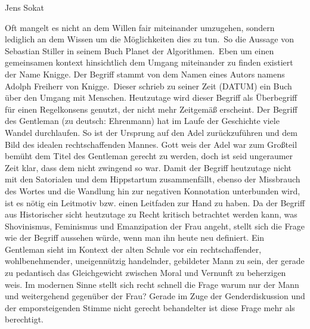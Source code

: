 Jens Sokat

\glqq Oft mangelt es nicht an dem Willen fair miteinander umzugehen, sondern lediglich an dem Wissen um die Möglichkeiten dies zu tun.\grqq \ So die Aussage von Sebastian Stiller
in seinem Buch \glqq Planet der Algorithmen.\grqq \ Eben um einen gemeinsamen kontext hinsichtlich dem Umgang miteinander zu finden existiert der Name Knigge. Der Begriff stammt
von dem Namen eines Autors namens \glqq Adolph Freiherr von Knigge.\grqq \ Dieser schrieb zu seiner Zeit (DATUM) ein Buch über den Umgang mit Menschen. Heutzutage wird dieser
Begriff als Überbegriff für einen Regelkonsens genutzt, der nicht mehr Zeitgemäß erscheint.
Der Begriff des Gentleman (zu deutsch: Ehrenmann) hat im Laufe der Geschichte viele Wandel durchlaufen. 
So ist der Ursprung auf den Adel zurückzuführen und dem Bild des idealen rechtschaffenden Mannes. 
Gott weis der Adel war zum Großteil bemüht dem Titel des Gentleman gerecht zu werden, doch ist seid ungeraumer Zeit klar, 
dass dem nicht zwingend so war. Damit der Begriff heutzutage nicht mit den Satorialen und dem Hippstartum zusammenfällt,
ebenso der Missbrauch des Wortes und die Wandlung hin zur negativen Konnotation unterbunden wird, ist es nötig ein Leitmotiv bzw. 
einen Leitfaden zur Hand zu haben. Da der Begriff aus Historischer sicht heutzutage zu Recht kritisch betrachtet werden kann, was Shovinismus,
Feminismus und Emanzipation der Frau angeht, stellt sich die Frage wie der Begriff aussehen würde, wenn man ihn heute neu definiert.
Ein Gentleman sieht im Kontext der alten Schule vor ein rechtschaffender, wohlbenehmender, uneigennützig handelnder, 
gebildeter Mann zu sein, der gerade zu pedantisch das Gleichgewicht zwischen Moral und Vernunft zu beherzigen weis.
Im modernen Sinne stellt sich recht schnell die Frage warum nur der Mann und weitergehend gegenüber der Frau?
Gerade im Zuge der Genderdiskussion und der emporsteigenden Stimme nicht gerecht behandelter ist diese Frage mehr als berechtigt.

